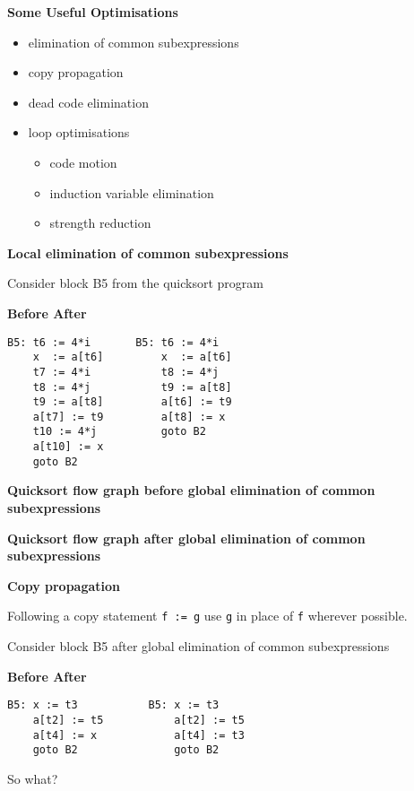 %
%
\begin{slide}{}
{\bf Some Useful Optimisations}
\begin{itemize}
\item elimination of common subexpressions
\item copy propagation
\item dead code elimination
\item loop optimisations
 \begin{itemize}
 \item code motion
 \item induction variable elimination
 \item strength reduction
 \end{itemize}
\end{itemize}
\end{slide}
%
%
\begin{slide}{}
{\bf Local elimination of common subexpressions}

Consider block B5 from the quicksort program 

{\bf Before \hspace{7em} After}\\
\begin{verbatim}
B5: t6 := 4*i       B5: t6 := 4*i
    x  := a[t6]         x  := a[t6]
    t7 := 4*i           t8 := 4*j
    t8 := 4*j           t9 := a[t8]
    t9 := a[t8]         a[t6] := t9
    a[t7] := t9         a[t8] := x
    t10 := 4*j          goto B2
    a[t10] := x
    goto B2
\end{verbatim}
\end{slide}
%
%
\begin{slide}{}
{\bf Quicksort flow graph before global elimination of common subexpressions} 

\vspace{3ex}

\end{slide}
%
%
\begin{slide}{}
{\bf Quicksort flow graph after global elimination of common subexpressions} 

\vspace{3ex}

\end{slide}
%
%
\begin{slide}{}
{\bf Copy propagation}

Following a copy statement {\tt f := g} use {\tt g} in place of {\tt f} wherever possible.

Consider block B5 after global elimination of common subexpressions

{\bf Before \hspace{7em} After}\\
\begin{verbatim}
B5: x := t3           B5: x := t3
    a[t2] := t5           a[t2] := t5
    a[t4] := x            a[t4] := t3
    goto B2               goto B2
\end{verbatim}

So what?
\end{slide}

